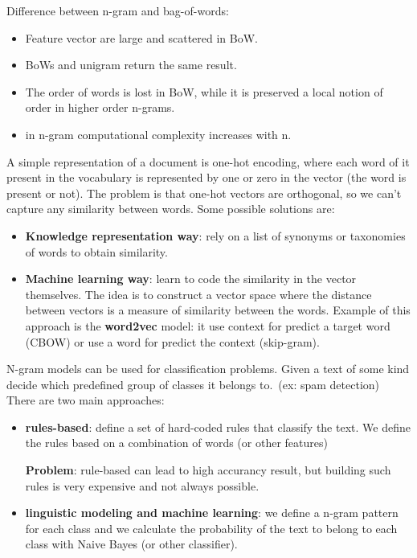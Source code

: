 \documentclass[12pt]{article}
\begin{document}
\begin{enumerate}[label=\textbf{NLP.\arabic*}]
    Difference between n-gram and bag-of-words:
    \begin{itemize}
        \item Feature vector are large and scattered in BoW.
        \item BoWs and unigram return the same result.
        \item The order of words is lost in BoW, while it is preserved a local notion of order in higher order n-grams.
        \item in n-gram computational complexity increases with n.
    \end{itemize}
    A simple representation of a document is one-hot encoding, where each word of it present in the vocabulary is represented 
    by one or zero in the vector (the word is present or not).
    The problem is that one-hot vectors are orthogonal, so we can't capture any similarity between words.
    Some possible solutions are:
    \begin{itemize}
        \item \textbf{Knowledge representation way}: rely on a list of synonyms or taxonomies of words to obtain similarity.
        \item \textbf{Machine learning way}: learn to code the similarity in the vector themselves.
        The idea is to construct a vector space where the distance between vectors is a measure of similarity between the words.
        Example of this approach is the \textbf{word2vec} model: it use context for predict a target word (CBOW) or use a word for predict the context (skip-gram).

    \end{itemize}

    N-gram models can be used for classification problems.
    Given a text of some kind decide which predefined group of classes it belongs to.\ (ex: spam detection)
    There are two main approaches:
    \begin{itemize}
        \item \textbf{rules-based}: define a set of hard-coded rules that classify the text.
        We define the rules based on a combination of words (or other features)

        \textbf{Problem}: rule-based can lead to high accurancy result, but building such rules is very expensive and not always possible.
        \item \textbf{linguistic modeling and machine learning}: we define a n-gram pattern for each class and we calculate the probability 
        of the text to belong to each class with Naive Bayes (or other classifier). 
    \end{itemize}


\end{enumerate}
\end{document}
